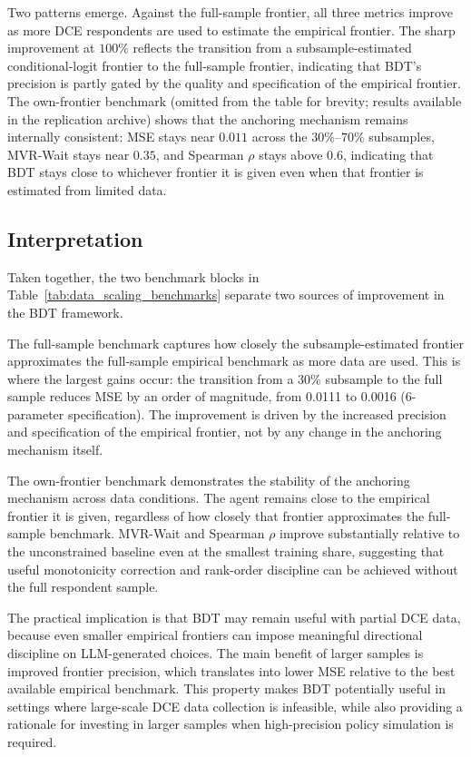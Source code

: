 \documentclass[11pt]{article}
\begin{document}
Two patterns emerge. Against the full-sample frontier, all three metrics improve as more DCE respondents are used to estimate the empirical frontier. The sharp improvement at $100\%$ reflects the transition from a subsample-estimated conditional-logit frontier to the full-sample frontier, indicating that BDT's precision is partly gated by the quality and specification of the empirical frontier. The own-frontier benchmark (omitted from the table for brevity; results available in the replication archive) shows that the anchoring mechanism remains internally consistent: MSE stays near $0.011$ across the $30\%$--$70\%$ subsamples, MVR-Wait stays near $0.35$, and Spearman $\rho$ stays above $0.6$, indicating that BDT stays close to whichever frontier it is given even when that frontier is estimated from limited data.

\subsection{Interpretation}
\label{app:interpretation}

Taken together, the two benchmark blocks in Table~\ref{tab:data_scaling_benchmarks} separate two sources of improvement in the BDT framework.

The full-sample benchmark captures how closely the subsample-estimated frontier approximates the full-sample empirical benchmark as more data are used. This is where the largest gains occur: the transition from a 30\% subsample to the full sample reduces MSE by an order of magnitude, from 0.0111 to 0.0016 (6-parameter specification). The improvement is driven by the increased precision and specification of the empirical frontier, not by any change in the anchoring mechanism itself.

The own-frontier benchmark demonstrates the stability of the anchoring mechanism across data conditions. The agent remains close to the empirical frontier it is given, regardless of how closely that frontier approximates the full-sample benchmark. MVR-Wait and Spearman \(\rho\) improve substantially relative to the unconstrained baseline even at the smallest training share, suggesting that useful monotonicity correction and rank-order discipline can be achieved without the full respondent sample.

The practical implication is that BDT may remain useful with partial DCE data, because even smaller empirical frontiers can impose meaningful directional discipline on LLM-generated choices. The main benefit of larger samples is improved frontier precision, which translates into lower MSE relative to the best available empirical benchmark. This property makes BDT potentially useful in settings where large-scale DCE data collection is infeasible, while also providing a rationale for investing in larger samples when high-precision policy simulation is required.
\end{document}
